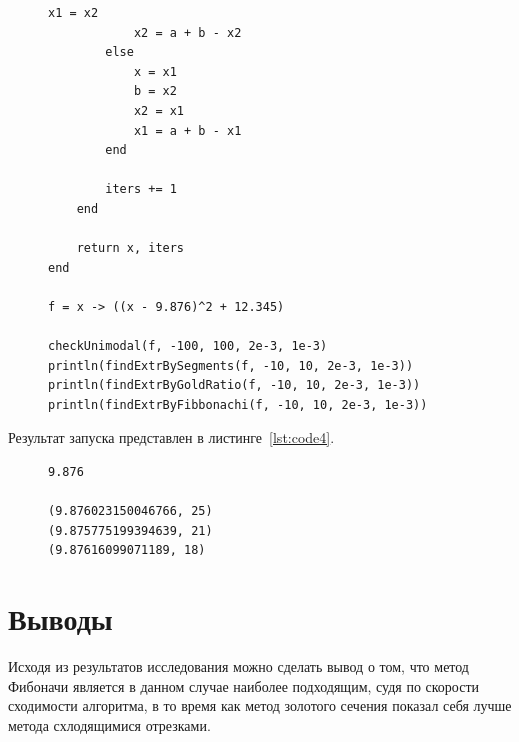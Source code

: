 \documentclass[a4paper, 14pt]{extarticle}
\begin{document}
\begin{figure}[!htb]
\begin{lstlisting}[language={},caption={Нахождение минимумов функции},label={lst:code3}]
            x1 = x2
            x2 = a + b - x2
        else
            x = x1
            b = x2
            x2 = x1
            x1 = a + b - x1
        end

        iters += 1
    end

    return x, iters
end

f = x -> ((x - 9.876)^2 + 12.345)

checkUnimodal(f, -100, 100, 2e-3, 1e-3)
println(findExtrBySegments(f, -10, 10, 2e-3, 1e-3))
println(findExtrByGoldRatio(f, -10, 10, 2e-3, 1e-3))
println(findExtrByFibbonachi(f, -10, 10, 2e-3, 1e-3))
\end{lstlisting}
\end{figure}

Результат запуска представлен в листинге~\ref{lst:code4}.

\begin{figure}[!htb]
\begin{lstlisting}[language={},caption={Нахождение минимумов функции},label={lst:code4}]
9.876

(9.876023150046766, 25)
(9.875775199394639, 21)
(9.87616099071189, 18)
\end{lstlisting}
\end{figure}

\section{Выводы}\label{Sect::conclusions}

Исходя из результатов исследования можно сделать вывод о том, что метод Фибоначи является в данном случае наиболее подходящим, судя по скорости сходимости алгоритма, в то время как метод золотого сечения показал себя лучше метода схлодящимися отрезками.
\end{document}

